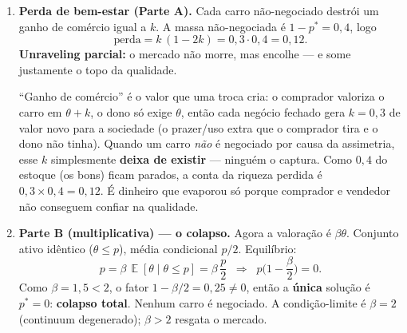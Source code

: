\documentclass[11pt,a4paper]{article}
\DeclareMathOperator{\Esp}{\mathbb{E}}
\newcommand{\dc}[2]{#1{,}#2}
\begin{document}
\begin{enumerate}[leftmargin=2em,itemsep=4pt]
\begin{empalavras}[O que é ``ponto fixo'' e o que $p^\ast = \dc{0}{6}$ quer dizer]
Repare na estrutura circular: o preço depende de quem vende, mas quem vende depende do
preço. Para o mercado ``parar'' (entrar em equilíbrio), precisamos de um preço que seja
\emph{consistente consigo mesmo}: se o preço é $p$, então a média dos carros que aparecem é
$p/2$, então o comprador (que paga essa média mais o prêmio $k$) oferece $p/2 + k$ — e
esse valor tem de ser igual ao próprio $p$ de onde partimos. Um valor que ``volta nele
mesmo'' assim se chama \textbf{ponto fixo}. Resolver $p/2 + k = p$ acha esse ponto.

\smallskip\noindent
\textbf{Tradução do resultado:} $p^\ast = \dc{0}{6}$ não é só um número. Ele diz que
\emph{40\% dos melhores carros desaparecem do mercado} — e desaparecem \textbf{justamente
por serem bons}: seus donos exigem mais do que $\dc{0}{6}$, ninguém oferece tanto (porque o
comprador, em média, só encontra carros medianos), e o negócio não acontece. A assimetria
de informação \emph{expulsa a qualidade}. É a isto que Akerlof deu o nome de
\emph{unraveling} (algo como ``desfiamento'': o topo do mercado se desfaz).
\end{empalavras}

\item \textbf{Perda de bem-estar (Parte A).} Cada carro não-negociado destrói um ganho de
comércio igual a $k$. A massa não-negociada é $1 - p^\ast = \dc{0}{4}$, logo
\[
\text{perda} = k\,(1 - 2k) = \dc{0}{3}\cdot \dc{0}{4} = \dc{0}{12}. \tag{1.3}
\]
\textbf{Unraveling parcial:} o mercado não morre, mas encolhe — e some justamente o topo
da qualidade.

\begin{empalavras}
``Ganho de comércio'' é o valor que uma troca cria: o comprador valoriza o carro em
$\theta + k$, o dono só exige $\theta$, então cada negócio fechado gera $k = \dc{0}{3}$ de
valor novo para a sociedade (o prazer/uso extra que o comprador tira e o dono não tinha).
Quando um carro \emph{não} é negociado por causa da assimetria, esse $k$ simplesmente
\textbf{deixa de existir} — ninguém o captura. Como $\dc{0}{4}$ do estoque (os bons) ficam
parados, a conta da riqueza perdida é $\dc{0}{3} \times \dc{0}{4} = \dc{0}{12}$. É dinheiro
que evaporou só porque comprador e vendedor não conseguem confiar na qualidade.
\end{empalavras}

\item \textbf{Parte B (multiplicativa) — o colapso.} Agora a valoração é $\beta\theta$.
Conjunto ativo idêntico ($\theta \le p$), média condicional $p/2$. Equilíbrio:
\[
p = \beta\,\Esp[\theta\mid\theta\le p] = \beta\,\frac{p}{2}
\;\;\Longrightarrow\;\; p\Big(1 - \frac{\beta}{2}\Big) = 0. \tag{1.4}
\]
Como $\beta = \dc{1}{5} < 2$, o fator $1 - \beta/2 = \dc{0}{25} \ne 0$, então a
\textbf{única} solução é $p^\ast = 0$: \textbf{colapso total}. Nenhum carro é negociado.
A condição-limite é $\beta = 2$ (continuum degenerado); $\beta > 2$ resgata o mercado.


\end{enumerate}
\end{document}
